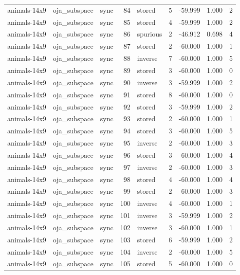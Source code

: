 \begin{tabular}{lllrlrrrr}
animals-14x9 & oja\_subspace & sync & 84 & stored & 5 & -59.999 & 1.000 & 2 \\
animals-14x9 & oja\_subspace & sync & 85 & stored & 4 & -59.999 & 1.000 & 2 \\
animals-14x9 & oja\_subspace & sync & 86 & spurious & 2 & -46.912 & 0.698 & 4 \\
animals-14x9 & oja\_subspace & sync & 87 & stored & 2 & -60.000 & 1.000 & 1 \\
animals-14x9 & oja\_subspace & sync & 88 & inverse & 7 & -60.000 & 1.000 & 5 \\
animals-14x9 & oja\_subspace & sync & 89 & stored & 3 & -60.000 & 1.000 & 0 \\
animals-14x9 & oja\_subspace & sync & 90 & inverse & 3 & -59.999 & 1.000 & 2 \\
animals-14x9 & oja\_subspace & sync & 91 & stored & 8 & -60.000 & 1.000 & 0 \\
animals-14x9 & oja\_subspace & sync & 92 & stored & 3 & -59.999 & 1.000 & 2 \\
animals-14x9 & oja\_subspace & sync & 93 & stored & 2 & -60.000 & 1.000 & 1 \\
animals-14x9 & oja\_subspace & sync & 94 & stored & 3 & -60.000 & 1.000 & 5 \\
animals-14x9 & oja\_subspace & sync & 95 & inverse & 2 & -60.000 & 1.000 & 3 \\
animals-14x9 & oja\_subspace & sync & 96 & stored & 3 & -60.000 & 1.000 & 4 \\
animals-14x9 & oja\_subspace & sync & 97 & inverse & 2 & -60.000 & 1.000 & 3 \\
animals-14x9 & oja\_subspace & sync & 98 & stored & 4 & -60.000 & 1.000 & 4 \\
animals-14x9 & oja\_subspace & sync & 99 & stored & 2 & -60.000 & 1.000 & 3 \\
animals-14x9 & oja\_subspace & sync & 100 & inverse & 4 & -60.000 & 1.000 & 1 \\
animals-14x9 & oja\_subspace & sync & 101 & inverse & 3 & -59.999 & 1.000 & 2 \\
animals-14x9 & oja\_subspace & sync & 102 & inverse & 3 & -60.000 & 1.000 & 1 \\
animals-14x9 & oja\_subspace & sync & 103 & stored & 6 & -59.999 & 1.000 & 2 \\
animals-14x9 & oja\_subspace & sync & 104 & inverse & 2 & -60.000 & 1.000 & 5 \\
animals-14x9 & oja\_subspace & sync & 105 & stored & 5 & -60.000 & 1.000 & 0 \\

\end{tabular}
